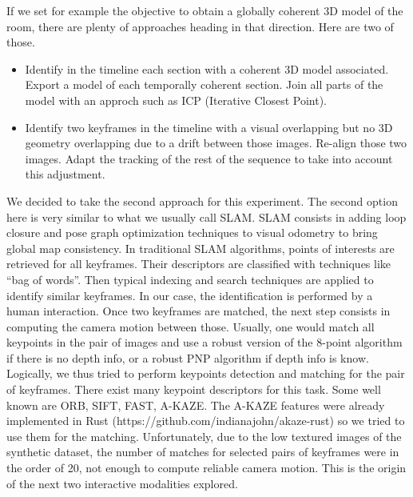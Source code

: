 If we set for example the objective to obtain a globally coherent 3D model of the room,
there are plenty of approaches heading in that direction.
Here are two of those.

\begin{itemize}
	\item Identify in the timeline each section with a coherent 3D model associated.
		Export a model of each temporally coherent section.
		Join all parts of the model with an approch such as ICP (Iterative Closest Point).
	\item Identify two keyframes in the timeline with a visual overlapping
		but no 3D geometry overlapping due to a drift between those images.
		Re-align those two images.
		Adapt the tracking of the rest of the sequence to take into account this adjustment.
\end{itemize}

We decided to take the second approach for this experiment.
The second option here is very similar to what we usually call SLAM.
SLAM consists in adding loop closure and pose graph optimization techniques
to visual odometry to bring global map consistency.
In traditional SLAM algorithms, points of interests are retrieved for all keyframes.
Their descriptors are classified with techniques like ``bag of words''.
Then typical indexing and search techniques are applied to identify similar keyframes.
In our case, the identification is performed by a human interaction.
Once two keyframes are matched, the next step consists in computing
the camera motion between those.
Usually, one would match all keypoints in the pair of images
and use a robust version of the 8-point algorithm if there is no depth info,
or a robust PNP algorithm if depth info is know.
Logically, we thus tried to perform keypoints detection and matching for the pair of keyframes.
There exist many keypoint descriptors for this task.
Some well known are ORB, SIFT, FAST, A-KAZE.
The A-KAZE features were already implemented in Rust (https://github.com/indianajohn/akaze-rust)
so we tried to use them for the matching.
Unfortunately, due to the low textured images of the synthetic dataset,
the number of matches for selected pairs of keyframes were in the order of 20,
not enough to compute reliable camera motion.
This is the origin of the next two interactive modalities explored.

